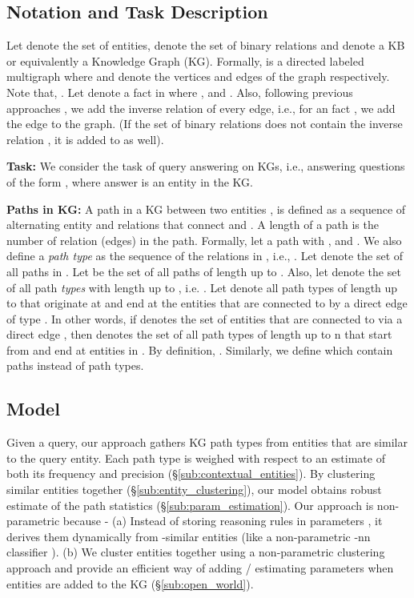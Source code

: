 \documentclass[11pt,a4paper]{article}
\begin{document}
\subsection{Notation and Task Description}
\label{sub:notation}
 Let  denote the set of entities,  denote the set of binary relations and  denote a KB or equivalently a Knowledge Graph (KG). Formally,  is a directed labeled multigraph where  and  denote the vertices and edges of the graph respectively. Note that, . Let  denote a fact in  where ,    and . Also, following previous approaches \citep{bordes2013translating}, we add the inverse relation of every edge, i.e., for an fact , we add the edge  to the graph. (If the set of binary relations  does not contain the inverse relation , it is added to  as well).

\textbf{Task:} We consider the task of query answering on KGs,  i.e., answering questions of the form , where answer is an entity in the KG.

\textbf{Paths in KG:} A path in a KG between two entities ,  is defined as a sequence of alternating entity and relations that connect  and . A length of a path is the number of relation (edges) in the path. Formally, let a path  with ,  and . We also define a \emph{path type} as the sequence of the relations in , i.e., . Let  denote the set of all paths in . Let  be the set of all paths of length up to . Also, let   denote the set of all path \emph{types} with length up to , i.e. . Let  denote all path types of length up to  that originate at  and end at the entities that are connected to  by a direct edge of type . In other words, if  denotes the set of entities that are connected to  via a direct edge , then  denotes the set of all path types of length up to n that start from  and end at entities in . By definition, . Similarly, we define  which contain paths instead of path types.


\subsection{Model}
\label{sub:non_param_reasoning}

Given a query, our approach gathers KG path types from entities that are similar to the query entity. Each path type is weighed with respect to an estimate of both its frequency and precision (\S\ref{sub:contextual_entities}). By clustering similar entities together (\S\ref{sub:entity_clustering}), our model obtains robust estimate of the path statistics (\S\ref{sub:param_estimation}). Our approach is non-parametric because - (a) Instead of storing reasoning rules in parameters \cite{das2018go,minervini2019differentiable}, it derives them dynamically from -similar entities (like  a non-parametric -nn classifier \cite{cover1967nearest}). (b) We cluster entities together using a non-parametric clustering approach and provide an efficient way of adding / estimating parameters when entities are added to the KG (\S\ref{sub:open_world}).
\end{document}
